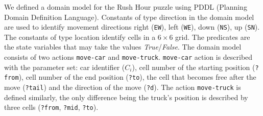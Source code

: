 \documentclass[doctor]{thesis} %
\theoremstyle{plain}
\begin{document}
We defined a domain model for the Rush Hour puzzle using PDDL (Planning Domain Definition Language). Constants of type direction in the domain model are used to identify movement directions right (\texttt{EW}), left (\texttt{WE}), down (\texttt{NS}), up (\texttt{SN}). The constants of type location identify cells in a $6 \times 6$ grid. The predicates are the state variables that may take the values \textit{True}/\textit{False}. The domain model consists of two actions \texttt{move-car} and \texttt{move-truck}. \texttt{move-car} action is described with the parameter set: car identifier ($C_i$), cell number of the starting position (\texttt{?from}), cell number of the end position (\texttt{?to}), the cell that becomes free after the move (\texttt{?tail}) and the direction of the move (\texttt{?d}). The action \texttt{move-truck} is defined similarly, the only difference being the truck's position is described by three cells (\texttt{?from}, \texttt{?mid}, \texttt{?to}). 
\end{document}
